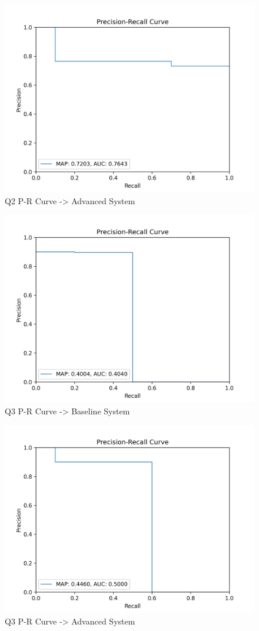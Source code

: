 \documentclass[sigconf]{acmart}
\begin{document}
\begin{figure}[H]
  \centering
  \includegraphics[width=0.8\linewidth]{precision_recall_q2a.png}
  \caption{Q2 P-R Curve -> Advanced System}
  \label{fig:precisionRecallAdvanced2}
\end{figure}

\begin{figure}[H]
  \centering
  \includegraphics[width=0.8\linewidth]{precision_recall_q3b.png}
  \caption{Q3 P-R Curve -> Baseline System}
  \label{fig:precisionRecallBaseline3}
\end{figure}

\begin{figure}[H]
  \centering
  \includegraphics[width=0.8\linewidth]{precision_recall_q3a.png}
  \caption{Q3 P-R Curve -> Advanced System}
  \label{fig:precisionRecallAdvanced3}
\end{figure}
\end{document}
